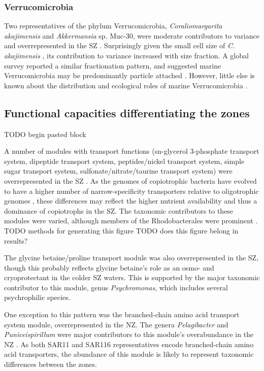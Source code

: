 \subsubsection{Verrucomicrobia}

Two representatives of the phylum Verrucomicrobia, \emph{Coraliomargarita akajimensis} and \emph{Akkermansia} sp. Muc-30, were moderate contributors to variance and overrepresented in the \ac{SZ} .
Surprisingly given the small cell size of \emph{C. akajimensis} \cite{Yoon:2007ic}, its contribution to variance increased with size fraction.
A global survey reported a similar fractionation pattern, and suggested marine Verrucomicrobia may be predominantly particle attached \cite{Freitas:2012jz}.
However, little else is known about the distribution and ecological roles of marine Verrucomicrobia \cite{Freitas:2012jz}.

\subsection{Functional capacities differentiating the zones}

TODO begin pasted block

A number of modules with transport functions (sn-glycerol 3-phosphate transport system, dipeptide transport system, peptides/nickel transport system, simple sugar transport system, sulfonate/nitrate/taurine transport system) were overrepresented in the \ac{SZ} .
As the genomes of copiotrophic bacteria have evolved to have a higher number of narrow-specificity transporters relative to oligotrophic genomes \cite{Lauro:2009gx}, these differences may reflect the higher nutrient availability and thus a dominance of copiotrophs in the \ac{SZ}.
The taxonomic contributors to these modules were varied, although members of the Rhodobacterales were prominent .
TODO methods for generating this figure
TODO does this figure belong in results?

The glycine betaine/proline transport module was also overrepresented in the \ac{SZ}, though this probably reflects glycine betaine's role as an osmo- and cryoprotectant in the colder \ac{SZ} waters.
This is supported by the major taxonomic contributor to this module, genus \emph{Psychromonas}, which includes several psychrophilic species. 

One exception to this pattern was the branched-chain amino acid transport system module, overrepresented in the \ac{NZ}. 
The genera \emph{Pelagibacter} and \emph{Puniceispirillum} were major contributors to this module's overabundance in the \ac{NZ} .
As both SAR11 \cite{Giovannoni:2005ib} and SAR116 \cite{Grote:2011dm} representatives encode branched-chain amino acid transporters, the abundance of this module is likely to represent taxonomic differences between the zones.

